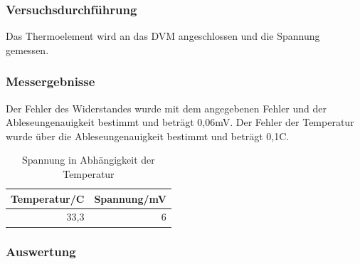 \documentclass[12pt,a4paper]{article}
\begin{document}
\subsubsection*{Versuchsdurchführung}

Das Thermoelement wird an das DVM angeschlossen und die Spannung gemessen.

\subsubsection*{Messergebnisse}

Der Fehler des Widerstandes wurde mit dem angegebenen Fehler und der Ableseungenauigkeit bestimmt und beträgt 0,06mV. Der Fehler der Temperatur wurde über die Ableseungenauigkeit bestimmt und beträgt 0,1C.


\begin{table}[H]
\begin{center}
\begin{tabular}{|r|r|}
\hline
\multicolumn{1}{|l|}{Temperatur/C} & \multicolumn{1}{l|}{Spannung/mV} \\ \hline
33,3 & 6 \\ \hline
\end{tabular}
\end{center}
\caption{Spannung in Abhängigkeit der Temperatur}
\label{tab:2_3}
\end{table}


\subsubsection*{Auswertung}
\end{document}

